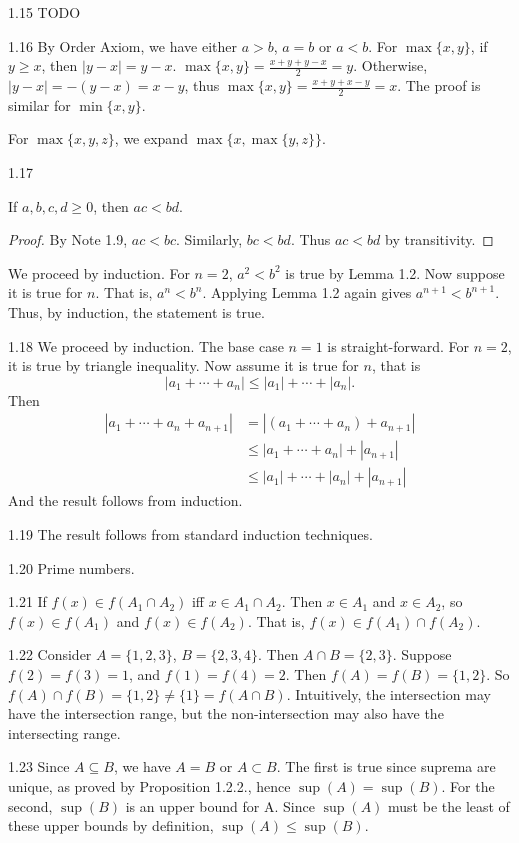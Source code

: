 1.15 TODO

1.16 By Order Axiom, we have either $a>b$, $a=b$ or $a<b$. For $\max\{x,y\}$, if $y\geq x$, then $|y-x|=y-x$. $\max\{x,y\}=\frac{x+y+y-x}{2}=y$. Otherwise, $|y-x|=-(y-x)=x-y$, thus $\max\{x,y\}=\frac{x+y+x-y}{2}=x$. The proof is similar for $\min\{x,y\}$. 

For $\max\{x,y,z\}$, we expand $\max\{x, \max\{y,z\}\}$.

1.17 \begin{lemma}
    If $a,b,c,d \geq 0$, then $ac < bd$.
\end{lemma}
\begin{proof}
    By Note 1.9, $ac < bc$. Similarly, $bc < bd$. Thus $ac < bd$ by transitivity.
\end{proof}
We proceed by induction. For $n=2$, $a^2 < b^2$ is true by Lemma 1.2. Now suppose
it is true for $n$. That is, $a^n < b^n$. Applying Lemma 1.2 again gives $a^{n+1}<b^{n+1}$.
Thus, by induction, the statement is true.

1.18 We proceed by induction. The base case $n=1$ is straight-forward. For $n=2$, it is true by triangle inequality.
Now assume it is true for $n$, that is \[ |a_1+\cdots+a_n| \leq |a_1|+\cdots+|a_n|.\]
Then \begin{align}
    |a_1+\cdots+a_n+a_{n+1}| &= |(a_1+\cdots+a_n)+a_{n+1}|\\
    &\leq |a_1+\cdots+a_n| + |a_{n+1}|\\
    &\leq |a_1|+\cdots+|a_n| + |a_{n+1}|
\end{align}
And the result follows from induction.

1.19 The result follows from standard induction techniques.

1.20 Prime numbers.

1.21 If $f(x) \in f(A_1 \cap A_2)$ iff $x \in A_1 \cap A_2$. Then $x \in A_1$ and $x \in A_2$, so $f(x) \in f(A_1)$ and $f(x) \in f(A_2)$.
That is, $f(x) \in f(A_1) \cap f(A_2)$.

1.22 Consider $A=\{1,2,3\}$, $B=\{2,3,4\}$. Then $A \cap B = \{2,3\}$. Suppose $f(2)=f(3)=1$, and $f(1)=f(4)=2$. Then $f(A)=f(B)=\{1,2\}$. So $f(A) \cap f(B) = \{1,2\} \neq \{1\}=f(A \cap B)$. Intuitively, the intersection may have the intersection range, but the non-intersection may also have the intersecting range.

1.23 Since $A \subseteq B$, we have $A=B$ or $A \subset B$. The first is true since suprema are unique, as proved by Proposition 1.2.2., hence $\sup(A)=\sup(B)$. For the second, $\sup(B)$ is an upper bound for A. Since $\sup(A)$ must be the least of these upper bounds by definition, $\sup(A) \leq \sup(B)$.

